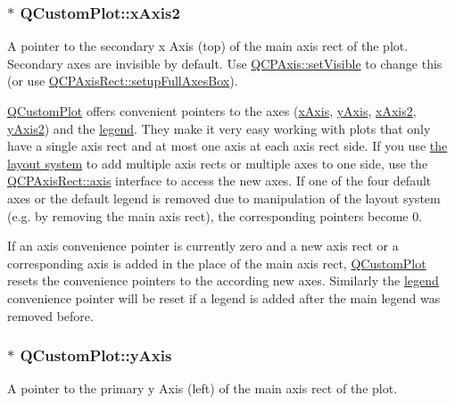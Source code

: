 \subsubsection[{\texorpdfstring{x\+Axis2}{xAxis2}}]{ $\ast$ Q\+Custom\+Plot\+::x\+Axis2}\hypertarget{class_q_custom_plot_ada41599f22cad901c030f3dcbdd82fd9}{}\label{class_q_custom_plot_ada41599f22cad901c030f3dcbdd82fd9}
A pointer to the secondary x Axis (top) of the main axis rect of the plot. Secondary axes are invisible by default. Use \hyperlink{class_q_c_p_layerable_a3bed99ddc396b48ce3ebfdc0418744f8}{Q\+C\+P\+Axis\+::set\+Visible} to change this (or use \hyperlink{class_q_c_p_axis_rect_a5fa906175447b14206954f77fc7f1ef4}{Q\+C\+P\+Axis\+Rect\+::setup\+Full\+Axes\+Box}).

\hyperlink{class_q_custom_plot}{Q\+Custom\+Plot} offers convenient pointers to the axes (\hyperlink{class_q_custom_plot_a9a79cd0158a4c7f30cbc702f0fd800e4}{x\+Axis}, \hyperlink{class_q_custom_plot_af6fea5679725b152c14facd920b19367}{y\+Axis}, \hyperlink{class_q_custom_plot_ada41599f22cad901c030f3dcbdd82fd9}{x\+Axis2}, \hyperlink{class_q_custom_plot_af13fdc5bce7d0fabd640f13ba805c0b7}{y\+Axis2}) and the \hyperlink{class_q_custom_plot_a4eadcd237dc6a09938b68b16877fa6af}{legend}. They make it very easy working with plots that only have a single axis rect and at most one axis at each axis rect side. If you use \hyperlink{}{the layout system} to add multiple axis rects or multiple axes to one side, use the \hyperlink{class_q_c_p_axis_rect_a560de44e47a4af0f86c59102a094b1e4}{Q\+C\+P\+Axis\+Rect\+::axis} interface to access the new axes. If one of the four default axes or the default legend is removed due to manipulation of the layout system (e.\+g. by removing the main axis rect), the corresponding pointers become 0.

If an axis convenience pointer is currently zero and a new axis rect or a corresponding axis is added in the place of the main axis rect, \hyperlink{class_q_custom_plot}{Q\+Custom\+Plot} resets the convenience pointers to the according new axes. Similarly the \hyperlink{class_q_custom_plot_a4eadcd237dc6a09938b68b16877fa6af}{legend} convenience pointer will be reset if a legend is added after the main legend was removed before. 
\subsubsection[{\texorpdfstring{y\+Axis}{yAxis}}]{ $\ast$ Q\+Custom\+Plot\+::y\+Axis}\hypertarget{class_q_custom_plot_af6fea5679725b152c14facd920b19367}{}\label{class_q_custom_plot_af6fea5679725b152c14facd920b19367}
A pointer to the primary y Axis (left) of the main axis rect of the plot.

